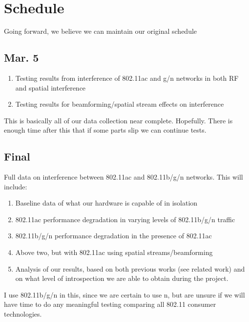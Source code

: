 \section{Schedule}


Going forward, we believe we can maintain our original schedule

\subsection{Mar. 5}
\begin{enumerate}
\item Testing results from interference of 802.11ac and g/n networks in both RF and spatial interference
\item Testing results for beamforming/spatial stream effects on interference
\end{enumerate}
This is basically all of our data collection near
complete. Hopefully. There is enough time after this that if some
parts slip we can continue tests.

\subsection{Final}
Full data on interference between 802.11ac and 802.11b/g/n networks. This will include:
\begin{enumerate}
\item Baseline data of what our hardware is capable of in isolation
\item 802.11ac performance degradation in varying levels of 802.11b/g/n traffic
\item 802.11b/g/n performance degradation in the presence of 802.11ac
\item Above two, but with 802.11ac using spatial streams/beamforming
\item Analysis of our results, based on both previous works (see
  related work) and on what level of introspection we are able to
  obtain during the project.
\end{enumerate}

I use 802.11b/g/n in this, since we are certain to use n, but are
unsure if we will have time to do any meaningful testing comparing all
802.11 consumer technologies.
